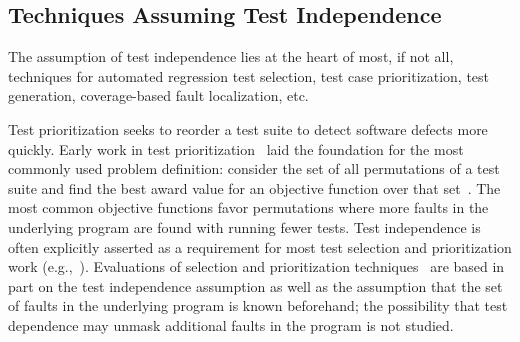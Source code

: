 

\subsection{Techniques Assuming Test Independence}

The assumption of test independence lies at the heart of most,
if not all, techniques for automated regression test selection,
test case prioritization, test generation, coverage-based
fault localization, etc. 


Test prioritization seeks to reorder a test suite to detect
software defects more quickly. 
Early work in test
prioritization~\cite{Wong:1997:SER:851010.856115,Rothermel:1999:TCP:519621.853398}
laid the foundation for the most commonly used problem definition:
consider the set of all permutations of a test suite and find the best
award value for an objective function over that
set~\cite{Elbaum:2000:PTC:347324.348910}.  The most common objective
functions favor permutations where more faults in the underlying
program  are found with running fewer tests.
Test independence is often explicitly asserted as a
requirement for most test selection and prioritization work (e.g.,~\cite[p.~1500]{Rummel:2005:TPR:1066677.1067016}).
Evaluations of selection and prioritization techniques~\cite[\emph{et alia}]{Rothermel:1999:TCP:519621.853398,Do:2010:ETC:1907658.1908088}
are based in part on the test independence
assumption as well as the assumption that the set of faults in the underlying
program is known beforehand; the possibility that test dependence may unmask additional faults in the program is not studied.

